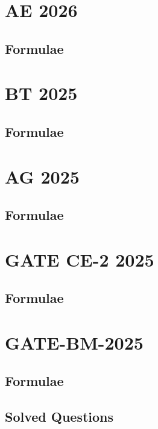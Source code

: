 \documentclass[journal]{IEEEtran}
\begin{document}
\newpage


\tableofcontents

\newpage
\onecolumn


\renewcommand{\thetable}{\theenumi}

\section{AE 2026}
\subsection{Formulae}

\section{BT 2025}
\subsection{Formulae}


\section{AG 2025}
\subsection{Formulae}

\section{GATE CE-2 2025}
\subsection{Formulae}

\section{GATE-BM-2025}
\subsection{Formulae}

\subsection{Solved Questions}

\iffalse
\end{document}
